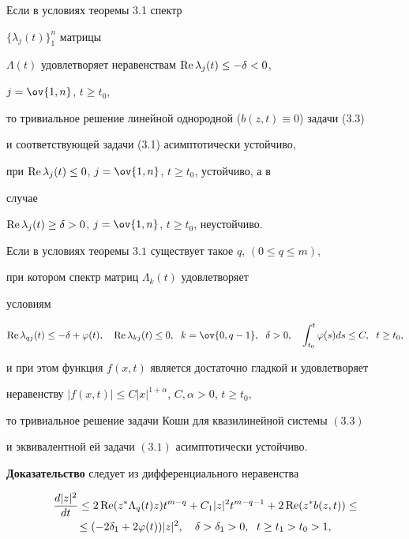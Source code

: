 \begin{cors}


Если в условиях теоремы 3.1 спектр 


$\{\lambda_j(t)\}^n_1$ матрицы  


$\Lambda(t)$ удовлетворяет неравенствам $\operatorname{Re}\lambda_j(t)\le-\delta<0$, 


$j=\ov{1,n}$, $t\ge t_0$, 


то тривиальное решение линейной однородной ($b(z,t)\equiv0$) задачи (3.3) 


и соответствующей задачи (3.1) асимптотически устойчиво,  


при $\operatorname{Re}\lambda_j(t)\le0$, $j=\ov{1,n}$, $t\ge t_0$, устойчиво, а в 


случае 


$\operatorname{Re}\lambda_j(t)\ge\delta>0$, $j=\ov{1,n}$, $t\ge t_0$, неустойчиво. 


\end{cors}


 


\begin{thms} 


Если в условиях теоремы $3.1$ существует такое $q$, $(0\le q\le m)$, 


при котором спектр матриц $\Lambda_k(t)$ удовлетворяет 


условиям 


$$ 


\re\lambda_{q j}(t)\le-\delta+\varphi(t),\quad 


\re\lambda_{k j}(t)\le 0,\ \; k=\ov{0,q-1},\ \;\delta>0,\quad 


\int^t_{t_0}\varphi(s)ds\le C,\ \; t\ge t_0,


$$ 


и при этом функция $f(x,t)$ является достаточно гладкой и удовлетворяет 


неравенству $|f(x,t)|\le C|x|^{1+\alpha}$, $C,\alpha>0$, $t\ge t_0$, 


то тривиальное решение задачи Коши для квазилинейной системы $(3.3)$ 


и эквивалентной ей задачи $(3.1)$ асимптотически устойчиво. 


\end{thms} 


 


{\bf Доказательство} следует из дифференциального неравенства 


\begin{multline*} 


\frac{d|z|^2}{d t}\le2\re(z^*\Lambda_q(t)z)t^{m-q}+ 


C_1|z|^2t^{m-q-1}+2\re(z^*b(z,t))\le \\ 


\le(-2\delta_1+2\varphi(t))|z|^2,\quad 


\delta>\delta_1>0,\ \; t\ge t_1>t_0>1, 


\end{multline*} 


